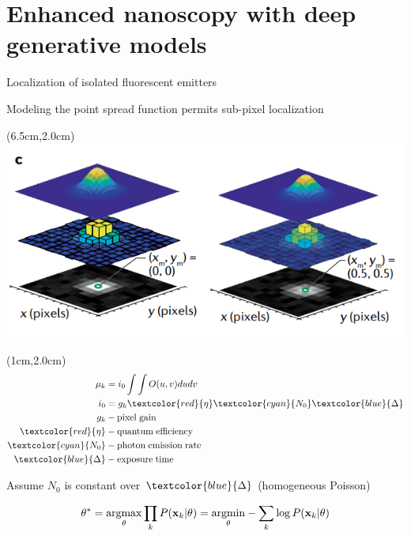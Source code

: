 \documentclass{beamer}					%
\begin{document}
\section{Enhanced nanoscopy with deep generative models}

\begin{frame}{Localization of isolated fluorescent emitters}

Modeling the point spread function permits sub-pixel localization 

\begin{textblock*}{8cm}(6.5cm,2.0cm)
\includegraphics[width=\textwidth]{media/Model.png}
\end{textblock*}

\begin{textblock*}{2cm}(1cm,2.0cm)
\begin{align*}
\mu_{k} &= i_{0}\int\int O(u,v)dudv\\
i_{0} &= g_{k}\textcolor{red}{\eta} \textcolor{cyan}{N_{0}}\textcolor{blue}{\Delta} 
\\
g_{k} &- \mathrm{pixel\; gain}\\
\textcolor{red}{\eta} &- \mathrm{quantum\; efficiency}\\
\textcolor{cyan}{N_{0}} &- \mathrm{photon\; emission\; rate}\\
\textcolor{blue}{\Delta} &- \mathrm{exposure\; time}
\end{align*}
\end{textblock*}

\vspace{2in}

Assume $N_{0}$ is constant over $\textcolor{blue}{\Delta}$ (homogeneous Poisson)

\begin{equation*}
\theta^{*} = \underset{\theta}{\mathrm{argmax}}\prod_{k}P(\bold{x}_{k}|\theta)= \underset{\theta}{\mathrm{argmin}}-\sum_{k}\log P(\bold{x}_{k}|\theta)
\end{equation*}

\end{frame}
\end{document}

